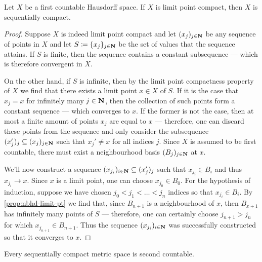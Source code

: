 \begin{lemma}
\label{lem:fst-countable-hausdorff-limit-pt-implies-seq-comp}
Let \(X\) be a first countable Hausdorff space. If \(X\) is limit point compact,
then \(X\) is sequentially compact.
\end{lemma}

\begin{proof}
Suppose \(X\) is indeed limit point compact and let \((x_j)_{j \in \mathbf{N}}\) be any
sequence of points in \(X\) and let \(S \coloneq \{x_j\}_{j \in \mathbf{N}}\) be the
set of values that the sequence attains. If \(S\) is finite, then the sequence
contains a constant subsequence --- which is therefore convergent in \(X\).

On the other hand, if \(S\) is infinite, then by the limit point compactness
property of \(X\) we find that there exists a limit point \(x \in X\) of
\(S\). If it is the case that \(x_j = x\) for infinitely many \(j \in \mathbf{N}\), then
the collection of such points form a constant sequence --- which converges to
\(x\). If the former is not the case, then at most a finite amount of points
\(x_j\) are equal to \(x\) --- therefore, one can discard these points from the
sequence and only consider the subsequence
\((x_j')_j \subseteq (x_j)_{j \in \mathbf{N}}\) such that \(x_j' \neq x\) for all
indices \(j\). Since \(X\) is assumed to be first countable, there must exist a
neighbourhood basis \((B_j)_{j \in \mathbf{N}}\) at \(x\).

We'll now construct a sequence \((x_{j_i})_{i \in \mathbf{N}} \subseteq (x_j')_j\) such
that \(x_{j_i} \in B_i\) and thus \(x_{j_i} \to x\). Since \(x\) is a limit
point, one can choose \(x_{j_0} \in B_0\). For the hypothesis of induction,
suppose we have chosen \(j_0 < j_1 < \dots < j_n\) indices so that \(x_{j_i} \in
B_i\). By \cref{prop:nbhd-limit-pt} we find that, since \(B_{n + 1}\) is a
neighbourhood of \(x\), then \(B_{x + 1}\) has infinitely many points of \(S\)
--- therefore, one can certainly choose \(j_{n+1} > j_n\) for which
\(x_{j_{n+1}} \in B_{n+1}\). Thus the sequence \((x_{j_i})_{i \in \mathbf{N}}\) was
successfully constructed so that it converges to \(x\).
\end{proof}

\begin{lemma}
\label{lem:metric-sequencially-comp-is-2nd-ctbl}
Every sequentially compact metric space is second countable.
\end{lemma}

